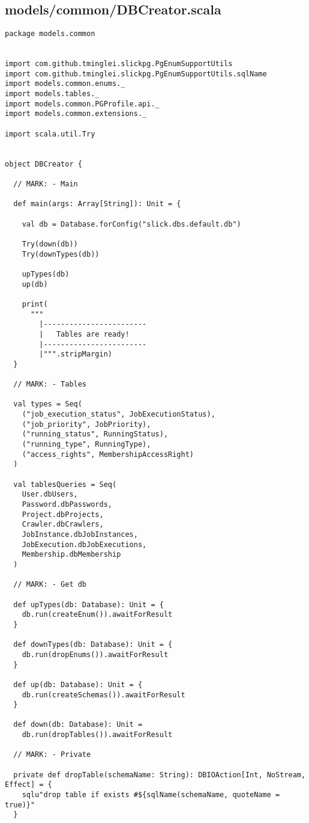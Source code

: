 \subsection{models/common/DBCreator.scala}
\begin{lstlisting}
package models.common


import com.github.tminglei.slickpg.PgEnumSupportUtils
import com.github.tminglei.slickpg.PgEnumSupportUtils.sqlName
import models.common.enums._
import models.tables._
import models.common.PGProfile.api._
import models.common.extensions._

import scala.util.Try


object DBCreator {

  // MARK: - Main

  def main(args: Array[String]): Unit = {

    val db = Database.forConfig("slick.dbs.default.db")

    Try(down(db))
    Try(downTypes(db))

    upTypes(db)
    up(db)

    print(
      """
        |------------------------
        |   Tables are ready!
        |------------------------
        |""".stripMargin)
  }

  // MARK: - Tables

  val types = Seq(
    ("job_execution_status", JobExecutionStatus),
    ("job_priority", JobPriority),
    ("running_status", RunningStatus),
    ("running_type", RunningType),
    ("access_rights", MembershipAccessRight)
  )

  val tablesQueries = Seq(
    User.dbUsers,
    Password.dbPasswords,
    Project.dbProjects,
    Crawler.dbCrawlers,
    JobInstance.dbJobInstances,
    JobExecution.dbJobExecutions,
    Membership.dbMembership
  )

  // MARK: - Get db

  def upTypes(db: Database): Unit = {
    db.run(createEnum()).awaitForResult
  }

  def downTypes(db: Database): Unit = {
    db.run(dropEnums()).awaitForResult
  }

  def up(db: Database): Unit = {
    db.run(createSchemas()).awaitForResult
  }

  def down(db: Database): Unit =
    db.run(dropTables()).awaitForResult

  // MARK: - Private

  private def dropTable(schemaName: String): DBIOAction[Int, NoStream, Effect] = {
    sqlu"drop table if exists #${sqlName(schemaName, quoteName = true)}"
  }


\end{lstlisting}
